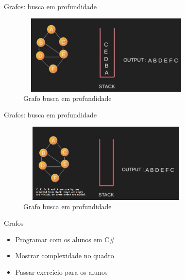 \begin{frame}
	\begin{block}{Grafos: busca em profundidade}
		\begin{figure}[!htb]
			\centering	  
			\includegraphics[height=4cm, width = 9cm]{./pic/dfs8.png}
			\caption{Grafo busca em profundidade \cite{GEEKS_2018}}
		\end{figure}
	\end{block}
\end{frame}

\begin{frame}
	\begin{block}{Grafos: busca em profundidade}
		\begin{figure}[!htb]
			\centering	  
			\includegraphics[height=4cm, width = 9cm]{./pic/dfs9.png}
			\caption{Grafo busca em profundidade \cite{GEEKS_2018}}
		\end{figure}
	\end{block}
\end{frame}

\begin{frame}
	\begin{block}{Grafos}
		\begin{itemize}
			\item Programar com os alunos em C\#	
			\item Mostrar complexidade no quadro	
			\item Passar exercício para os alunos
		\end{itemize}
	\end{block}
\end{frame}

